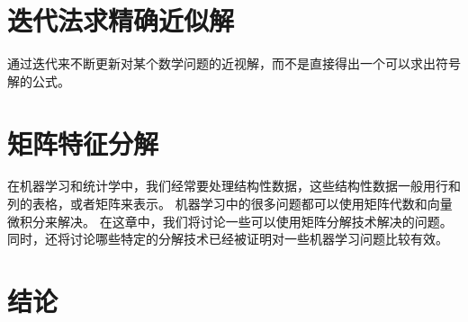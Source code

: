\chapter{迭代法求精确近似解}
\label{chap:iter}
通过迭代来不断更新对某个数学问题的近视解，而不是直接得出一个可以求出符号解的公式。

\chapter{矩阵特征分解}
\label{chap:matrix_decom}
在机器学习和统计学中，我们经常要处理结构性数据，这些结构性数据一般用行和列的表格，或者矩阵来表示。
机器学习中的很多问题都可以使用矩阵代数和向量微积分来解决。
在这章中，我们将讨论一些可以使用矩阵分解技术解决的问题。
同时，还将讨论哪些特定的分解技术已经被证明对一些机器学习问题比较有效。

\chapter{结论}
\label{chap:conclusion}